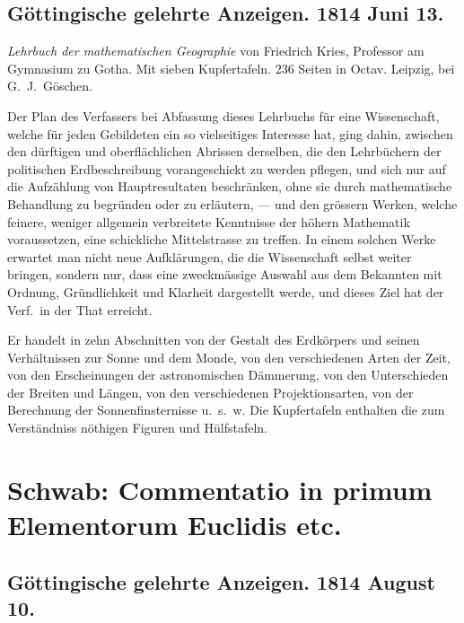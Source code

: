 \documentclass[fontsize=10pt,paper=a5,pagesize,headings=small,headinclude=true,footinclude=true]{scrbook}
\begin{document}
\subsection*{Göttingische gelehrte Anzeigen. 1814 Juni 13.}

\textit{Lehrbuch der mathematischen Geographie} von Friedrich Kries, Professor am Gymnasium zu Gotha. Mit sieben Kupfertafeln. 236 Seiten in Octav. Leipzig, bei G.~J.~Göschen.

Der Plan des Verfassers bei Abfassung dieses Lehrbuchs für eine Wissenschaft, welche für jeden Gebildeten ein so vielseitiges Interesse hat, ging dahin, zwischen den dürftigen und oberflächlichen Abrissen derselben, die den Lehrbüchern der politischen Erdbeschreibung vorangeschickt zu werden pflegen, und sich nur auf die Aufzählung von Hauptresultaten beschränken, ohne sie durch mathematische Behandlung zu begründen oder zu erläutern, --- und den grössern Werken, welche feinere, weniger allgemein verbreitete Kenntnisse der höhern Mathematik voraussetzen, eine schickliche Mittelstrasse zu treffen. In einem solchen Werke erwartet man nicht neue Aufklärungen, die die Wissenschaft selbst weiter bringen, sondern nur, dass eine zweckmässige Auswahl aus dem Bekannten mit Ordnung, Gründlichkeit und Klarheit dargestellt werde, und dieses Ziel hat der Verf.~in der That erreicht.

Er handelt in zehn Abschnitten von der Gestalt des Erdkörpers und seinen Verhältnissen zur Sonne und dem Monde, von den verschiedenen Arten der Zeit, von den Erscheinungen der astronomischen Dämmerung, von den Unterschieden der Breiten und Längen, von den verschiedenen Projektionsarten, von der Berechnung der Sonnenfinsternisse u.~s.~w. Die Kupfertafeln enthalten die zum Verständniss nöthigen Figuren und Hülfstafeln.

\newpage
\section*{Schwab: Commentatio in primum Elementorum Euclidis etc.}

\subsection*{Göttingische gelehrte Anzeigen. 1814 August 10.}
\end{document}
